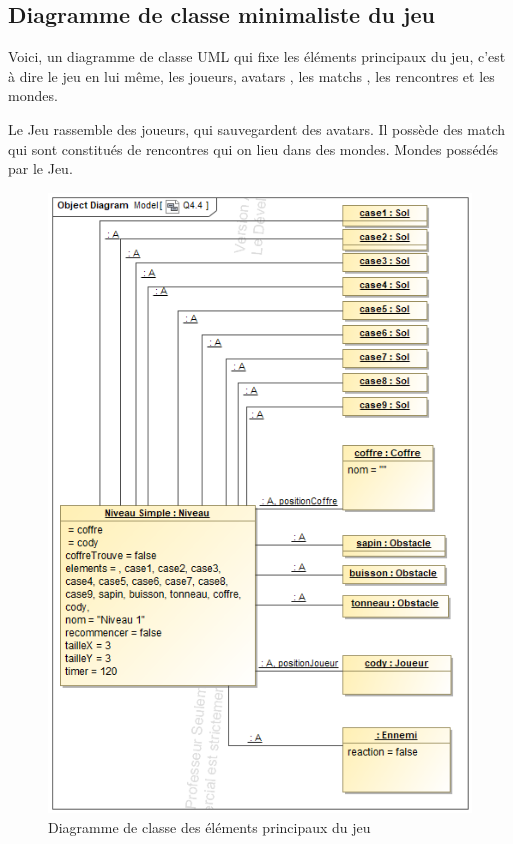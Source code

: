 
\subsection{Diagramme de classe minimaliste du jeu}
\label{sec:question-1}

Voici, un diagramme de classe UML qui fixe les éléments principaux du jeu, c'est à dire le jeu en lui même, les joueurs, avatars , les matchs , les rencontres et les mondes.

Le Jeu rassemble des joueurs, qui sauvegardent des avatars. Il possède des match qui sont constitués de rencontres qui on lieu dans des mondes. Mondes possédés par le Jeu.

\begin{figure}[h!]
	\centering
	\includegraphics[width=\textwidth]{assets/Jeu_minimalist}
	\caption{Diagramme de classe des éléments principaux du jeu}
	\label{fig:diagrammeclassebase}
\end{figure}

\newpage